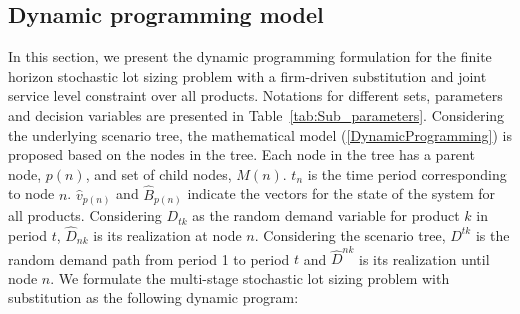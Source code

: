 \documentclass[10pt]{article}
\newcommand{\ti}{t} %
\newcommand{\TI}{T}
\newcommand{\ka}{k} %
\newcommand{\jey}{j} %
\newcommand{\Bi}{B} %
\newcommand{\Vi}{v} %
\newcommand{\InvPos}{inventory level after production }
\begin{document}
 
 









\subsection{Dynamic programming model}



In this section, we present the dynamic programming formulation for the finite horizon stochastic lot sizing problem with a firm-driven substitution and joint service level constraint over all products. Notations for different sets, parameters and decision variables are presented in Table~\ref{tab:Sub_parameters}. Considering the underlying scenario tree, the mathematical model (\ref{DynamicProgramming}) is proposed based on the nodes in the tree. Each node in the tree has a parent node, $p(n)$, and set of child nodes, $M(n)$. $\ti_{n}$ is the time period corresponding to node $n$. 
$\hat{\Vi}_{p(n)}$ and $\hat{\Bi}_{p(n)}$ indicate the vectors for the state of the system for all products. Considering $D_{\ti \ka}$ as the random demand variable for product $\ka$ in period $\ti$, $\hat{D}_{n \ka}$ is its realization at node $n$. Considering the scenario tree, $D^{\ti \ka}$ is the random demand path from period 1 to period $\ti$ and $\hat{D}^{n\ka}$ is its realization until node $n$. We formulate the multi-stage stochastic lot sizing problem with substitution as the following dynamic program:
\end{document}

